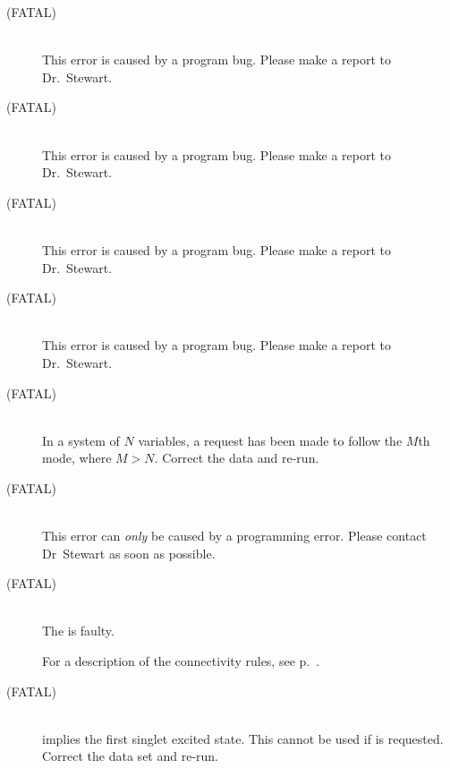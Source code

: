 \begin{description}
\item[ (FATAL)]~\\
This error is caused by a program bug.  Please make a report to Dr.~Stewart.

\item[ (FATAL)]~\\
This error is caused by a program bug.  Please make a report to Dr.~Stewart.

\item[ (FATAL)]~\\
This error is caused by a program bug.  Please make a report to Dr.~Stewart.

\item[ (FATAL)]~\\
This error is caused by a program bug.  Please make a report to Dr.~Stewart.

\item[ (FATAL)]~\\
In a system of $N$ variables, a request has been made to follow the $M$th
mode, where $M>N$.  Correct the data and re-run.

\item[ (FATAL)]~\\
This error can {\em only} be caused by a programming error.  Please contact
Dr~Stewart as soon as possible.

\item[ (FATAL)]~\\
The  is faulty.  
\begin{latexonly}
For a description of the connectivity rules, see p.~\pageref{int}.
\end{latexonly}

\item[ (FATAL)]~\\
 implies the first singlet excited state.  This cannot be used
if  is requested.  Correct the data set and re-run.


\end{description}
